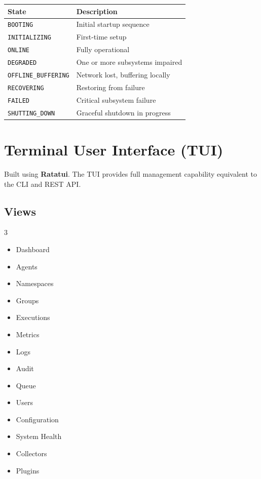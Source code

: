 \documentclass[12pt,a4paper]{article}
\begin{document}
\begin{center}
\begin{tabular}{ll}
\toprule
State & Description \\
\midrule
\texttt{BOOTING}           & Initial startup sequence \\
\texttt{INITIALIZING}      & First-time setup \\
\texttt{ONLINE}            & Fully operational \\
\texttt{DEGRADED}          & One or more subsystems impaired \\
\texttt{OFFLINE\_BUFFERING}& Network lost, buffering locally \\
\texttt{RECOVERING}        & Restoring from failure \\
\texttt{FAILED}            & Critical subsystem failure \\
\texttt{SHUTTING\_DOWN}    & Graceful shutdown in progress \\
\bottomrule
\end{tabular}
\end{center}

\section{Terminal User Interface (TUI)}

Built using \textbf{Ratatui}. The TUI provides full management capability equivalent to the CLI and REST API.

\subsection{Views}

\begin{multicols}{3}
\begin{itemize}[noitemsep,leftmargin=*]
    \item Dashboard
    \item Agents
    \item Namespaces
    \item Groups
    \item Executions
    \item Metrics
    \item Logs
    \item Audit
    \item Queue
    \item Users
    \item Configuration
    \item System Health
    \item Collectors
    \item Plugins
\end{itemize}
\end{multicols}
\end{document}
